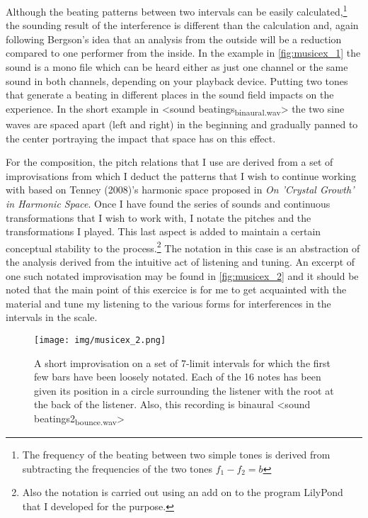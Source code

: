 \documentclass[11pt]{article}
\makeatletter
\newcommand{\cslcitation}[2]
 {\protect\hyper@linkstart{cite}{citeproc_bib_item_#1}#2\hyper@linkend}
\makeatother
\begin{document}
Although the beating patterns between two intervals can be easily calculated,\footnote{The frequency of the beating between two simple tones is derived from subtracting the frequencies of the two tones \(f_1-f_2 = b\)} the sounding result of the interference is different than the calculation and, again following Bergson's idea that an analysis from the outside will be a reduction compared to one performer from the inside.
In the example in \ref{fig:musicex_1} the sound is a mono file which can be heard either as just one channel or the same sound in both channels, depending on your playback device. Putting two tones that generate a beating in different places in the sound field impacts on the experience.
In the short example in <sound beatings\textsubscript{binaural.wav}> the two sine waves are spaced apart (left and right) in the beginning and gradually panned to the center portraying the impact that space has on this effect.

For the composition, the pitch relations that I use are derived from a set of improvisations from which I deduct the patterns that I wish to continue working with based on Tenney (\cslcitation{32}{2008})'s harmonic space proposed in \emph{On ’Crystal Growth’ in Harmonic Space}.
Once I have found the series of sounds and continuous transformations that I wish to work with, I notate the pitches and the transformations I played.
This last aspect is added to maintain a certain conceptual stability to the process.\footnote{Also the notation is carried out using an add on to the program LilyPond that I developed for the purpose.}
The notation in this case is an abstraction of the analysis derived from the intuitive act of listening and tuning.
An excerpt of one such notated improvisation may be found in \ref{fig:musicex_2} and it should be noted that the main point of this exercice is for me to get acquainted with the material and tune my listening to the various forms for interferences in the intervals in the scale.

\begin{figure}[htbp]
\centering
\texttt{[image: img/musicex\_2.png]}
\caption{\label{fig:org098f65e}A short improvisation on a set of 7-limit intervals for which the first few bars have been loosely notated. Each of the 16 notes has been given its  position in a circle surrounding the listener with the root at the back of the listener. Also, this recording is binaural <sound beatings2\textsubscript{bounce.wav}>}
\end{figure}
\end{document}
